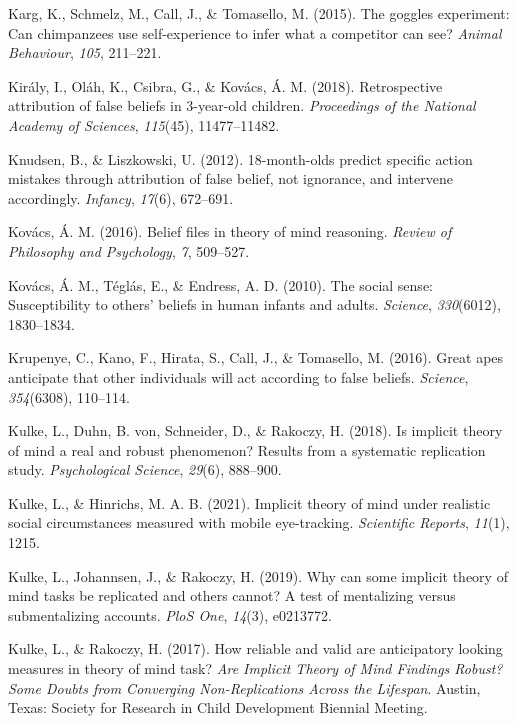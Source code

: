 \documentclass[
  man,floatsintext]{apa6}
\newlength{\cslhangindent}
\newenvironment{CSLReferences}[2] %
 {\begin{list}{}{%
  \setlength{\itemindent}{0pt}
  \setlength{\leftmargin}{0pt}
  \setlength{\parsep}{0pt}
  \ifodd #1
   \setlength{\leftmargin}{\cslhangindent}
   \setlength{\itemindent}{-1\cslhangindent}
  \fi
  \setlength{\itemsep}{#2\baselineskip}}}
 {\end{list}}
\begin{document}
\begin{CSLReferences}{1}{0}
Karg, K., Schmelz, M., Call, J., \& Tomasello, M. (2015). The goggles experiment: Can chimpanzees use self-experience to infer what a competitor can see? \emph{Animal Behaviour}, \emph{105}, 211--221.

Király, I., Oláh, K., Csibra, G., \& Kovács, Á. M. (2018). Retrospective attribution of false beliefs in 3-year-old children. \emph{Proceedings of the National Academy of Sciences}, \emph{115}(45), 11477--11482.

Knudsen, B., \& Liszkowski, U. (2012). 18-month-olds predict specific action mistakes through attribution of false belief, not ignorance, and intervene accordingly. \emph{Infancy}, \emph{17}(6), 672--691.

Kovács, Á. M. (2016). Belief files in theory of mind reasoning. \emph{Review of Philosophy and Psychology}, \emph{7}, 509--527.

Kovács, Á. M., Téglás, E., \& Endress, A. D. (2010). The social sense: Susceptibility to others' beliefs in human infants and adults. \emph{Science}, \emph{330}(6012), 1830--1834.

Krupenye, C., Kano, F., Hirata, S., Call, J., \& Tomasello, M. (2016). Great apes anticipate that other individuals will act according to false beliefs. \emph{Science}, \emph{354}(6308), 110--114.

Kulke, L., Duhn, B. von, Schneider, D., \& Rakoczy, H. (2018). Is implicit theory of mind a real and robust phenomenon? Results from a systematic replication study. \emph{Psychological Science}, \emph{29}(6), 888--900.

Kulke, L., \& Hinrichs, M. A. B. (2021). Implicit theory of mind under realistic social circumstances measured with mobile eye-tracking. \emph{Scientific Reports}, \emph{11}(1), 1215.

Kulke, L., Johannsen, J., \& Rakoczy, H. (2019). Why can some implicit theory of mind tasks be replicated and others cannot? A test of mentalizing versus submentalizing accounts. \emph{PloS One}, \emph{14}(3), e0213772.

Kulke, L., \& Rakoczy, H. (2017). How reliable and valid are anticipatory looking measures in theory of mind task? \emph{Are Implicit Theory of Mind Findings Robust? Some Doubts from Converging Non-Replications Across the Lifespan}. Austin, Texas: Society for Research in Child Development Biennial Meeting.


\end{CSLReferences}
\end{document}
